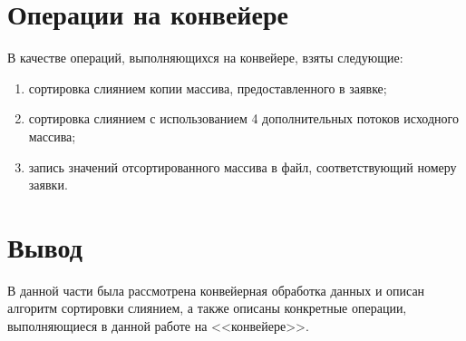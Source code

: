\section{Операции на конвейере}
В качестве операций, выполняющихся на конвейере, взяты следующие:
\begin{enumerate}
	\item сортировка слиянием копии массива, предоставленного в заявке;
	\item сортировка слиянием с использованием 4 дополнительных потоков исходного массива;
	\item запись значений отсортированного массива в файл, соответствующий номеру заявки.
\end{enumerate}


\section*{Вывод}
В данной части была рассмотрена конвейерная обработка данных и описан алгоритм сортировки слиянием, а также описаны конкретные операции, выполняющиеся в данной работе на <<конвейере>>.
